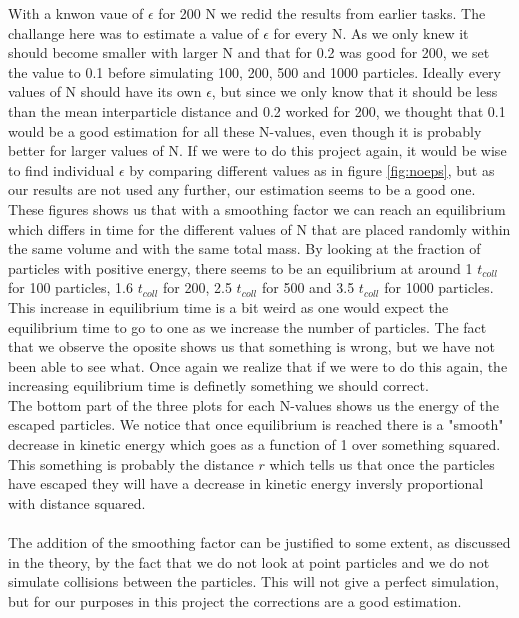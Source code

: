 \documentclass{article}
\begin{document}
With a knwon vaue of $\epsilon$ for 200 N we redid the results from earlier tasks. The challange here was to estimate a value of $\epsilon$ for every N. As we only knew it should become smaller with larger N and that for 0.2 was good for 200, we set the value to 0.1 before simulating 100, 200, 500 and 1000 particles. Ideally every values of N should have its own $\epsilon$, but since we only know that it should be less than the mean interparticle distance and 0.2 worked for 200, we thought that 0.1 would be a good estimation for all these N-values, even though it is probably better for larger values of N. If we were to do this project again, it would be wise to find individual $\epsilon$ by comparing different values as in figure \ref{fig:noeps}, but as our results are not used any further, our estimation seems to be a good one. \\
These figures shows us that with a smoothing factor we can reach an equilibrium which differs in time for the different values of N that are placed randomly within the same volume and with the same total mass. By looking at the fraction of particles with positive energy, there seems to be an equilibrium at around 1 $t_{coll}$ for 100 particles, 1.6 $t_{coll}$ for 200, 2.5 $t_{coll}$ for 500 and 3.5 $t_{coll}$ for 1000 particles. This increase in equilibrium time is a bit weird as one would expect the equilibrium time to go to one as we increase the number of particles. The fact that we observe the oposite shows us that something is wrong, but we have not been able to see what. Once again we realize that if we were to do this again, the increasing equilibrium time is definetly something we should correct.\\
The bottom part of the three plots for each N-values shows us the energy of the escaped particles. We notice that once equilibrium is reached there is a "smooth" decrease in kinetic energy which goes as a function of 1 over something squared. This something is probably the distance $r$ which tells us that once the particles have escaped they will have a decrease in kinetic energy inversly proportional with distance squared. \\ \\
The addition of the smoothing factor can be justified to some extent, as discussed in the theory, by the fact that we do not look at point particles and we do not simulate collisions between the particles. This will not give a perfect simulation, but for our purposes in this project the corrections are a good estimation. \\ \\
\end{document}
